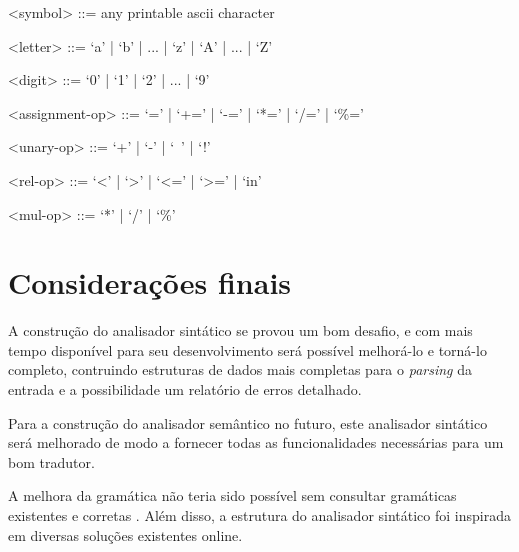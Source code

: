 \documentclass[
	article,			%
	11pt,				%
	oneside,			%
	a4paper,			%
	english,			%
	brazil,				%
	sumario=tradicional
	]{abntex2}
\begin{document}
\begin{grammar}
	<symbol> ::= any printable ascii character

	<letter> ::= `a' | `b' | ... | `z' | `A' | ... | `Z'
	
	<digit> ::= `0' | `1' | `2' | ... | `9'
	
	<assignment-op> ::= `=' | `+=' | `-=' | `*=' | `/=' | `\%='
	
	<unary-op> ::= `+' | `-' | `~' | `!'
	
	<rel-op> ::= `<' | `>' | `<=' | `>=' | `in'
	
	<mul-op> ::= `*' | `/' | `\%'
	
\end{grammar}

\section{Considerações finais}

A construção do analisador sintático se provou um bom desafio, e com mais tempo disponível para seu desenvolvimento será possível melhorá-lo e torná-lo completo, contruindo estruturas de dados mais completas para o \textit{parsing} da entrada e a possibilidade um relatório de erros detalhado.

Para a construção do analisador semântico no futuro, este analisador sintático será melhorado de modo a fornecer todas as funcionalidades necessárias para um bom tradutor.

A melhora da gramática não teria sido possível sem consultar gramáticas existentes e corretas \cite{Kernighan:1988:CPL:576122} \cite{BNFCM}. Além disso, a estrutura do analisador sintático foi inspirada em diversas soluções existentes online. \cite{youtube} \cite{Lucas1993}

% 

\postextual



%
%

\end{document}
